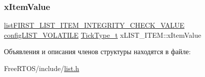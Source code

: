\mbox{\label{structx_l_i_s_t___i_t_e_m_a9b1f26de79f9da1403ca3ebc7a2e653a}} 
\subsubsection{\texorpdfstring{xItemValue}{xItemValue}}
{\footnotesize\ttfamily \mbox{\hyperlink{list_8h_a3611bd5d5d87cb26ac1dc7a4852b94a0}{list\+F\+I\+R\+S\+T\+\_\+\+L\+I\+S\+T\+\_\+\+I\+T\+E\+M\+\_\+\+I\+N\+T\+E\+G\+R\+I\+T\+Y\+\_\+\+C\+H\+E\+C\+K\+\_\+\+V\+A\+L\+UE}} \mbox{\hyperlink{list_8h_a2d5de557c5561c8980d1bf51d87d8cba}{config\+L\+I\+S\+T\+\_\+\+V\+O\+L\+A\+T\+I\+LE}} \mbox{\hyperlink{portmacro_8h_aa69c48c6e902ce54f70886e6573c92a9}{Tick\+Type\+\_\+t}} x\+L\+I\+S\+T\+\_\+\+I\+T\+E\+M\+::x\+Item\+Value}



Объявления и описания членов структуры находятся в файле\+:\begin{DoxyCompactItemize}
\item 
Free\+R\+T\+O\+S/include/\mbox{\hyperlink{list_8h}{list.\+h}}\end{DoxyCompactItemize}
